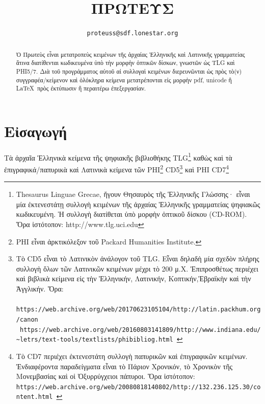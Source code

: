\documentclass[12pt,a4paper]{article}
\title{ΠΡΩΤΕΥΣ}
\author{\tt {\small proteuss@sdf.lonestar.org}}
\date{\grtoday}
\begin{document}
  \maketitle
  \begin{abstract}
    \noindent
    Ὁ Πρωτεὺς εἶναι μετατροπεὺς κειμένων τῆς ἀρχαίας Ἑλληνικῆς
    καὶ Λατινικῆς γραμματείας ἅτινα διατίθενται κωδικευμένα ὑπὸ τὴν μορφὴν
    ὀπτικῶν δίσκων, γνωστῶν ὡς TLG καὶ PHI5/7. Διὰ τοῦ προγράμματος αὐτοῦ
    αἱ συλλογαὶ κειμένων διερευνῶνται ὡς πρὸς τὸ(ν) συγγραφέα/κείμενον καὶ
    ὁλόκληρα κείμενα μετατρέπονται εἰς μορφὴν pdf, unicode ἢ \LaTeX\ πρὸς
    ἐκτύπωσιν ἢ περαιτέρω ἐπεξεργασίαν.
  \end{abstract}
  \tableofcontents
\section{Εἰσαγωγή}
  Τὰ ἀρχαῖα Ἑλληνικὰ κείμενα τῆς ψηφιακῆς βιβλιοθήκης
  TLG\footnote{Thesaurus Linguae Grecae, ἤγουν Θησαυρὸς
               τῆς Ἑλληνικῆς Γλώσσης· εἶναι μία ἐκτενεστάτῃ
               συλλογὴ κειμένων τῆς ἀρχαίας Ἑλληνικῆς
               γραμματείας ψηφιακῶς κωδικευμένη. Ἡ συλλογὴ
               διατίθεται ὑπὸ μορφὴν ὀπτικοῦ δίσκου (CD-ROM).
               Ὅρα ἱστότοπον: http://www.tlg.uci.edu}
  καθὼς καὶ τὰ ἐπιγραφικά/παπυρικὰ καὶ Λατινικὰ κείμενα τῶν
  PHI\footnote{PHI εἶναι ἀρκτικόλεξον τοῦ Packard Humanities Institute.}
  CD5\footnote{ Τὸ CD5 εἶναι τὸ Λατινικὸν ἀνάλογον τοῦ TLG.
                Εἶναι δηλαδὴ μία σχεδὸν πλήρης
                συλλογὴ ὅλων τῶν Λατινικῶν κειμένων μέχρι τὸ 200 μ.Χ.
                Ἐπιπροσθέτως περιέχει καὶ βιβλικὰ κείμενα εἰς τὴν
                Ἑλληνικήν, Λατινικήν, Κοπτικήν,Ἑβραϊκὴν καὶ τὴν
                Ἀγγλικήν. Ὅρα:\\
                  {\scriptsize\tt
                https://web.archive.org/web/20170623105104/http://latin.packhum.org/canon}\\
                  {\scriptsize\tt
                  https://web.archive.org/web/20160803141809/http://www.indiana.edu/
                \textasciitilde letrs/text-tools/textlists/phibibliog.html }
              }
  καὶ PHI CD7\footnote{Τὸ CD7 περιέχει ἐκτενεστάτη συλλογὴ παπυρικῶν καὶ
                    ἐπιγραφικῶν κειμένων. Ἐνδιαφέροντα παραδείγματα εἶναι
                    τὸ Πάριον Χρονικόν, τὸ Χρονικὸν τῆς Μονεμβασίας καὶ οἱ
                    Ὀξυρρύγχειοι πάπυροι. Ὅρα ἱστότοπον:\\
                       {\scriptsize\tt https://web.archive.org/web/20080818140802/http://132.236.125.30/content.html }}
\end{document}
